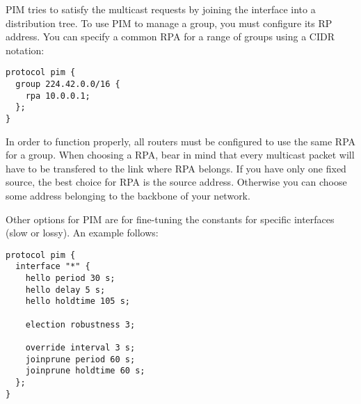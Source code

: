 PIM tries to satisfy the multicast requests by joining the interface into
a distribution tree. To use PIM to manage a group, you must configure its RP
address. You can specify a common RPA for a range of groups using a CIDR
notation:
\begin{lstlisting}
protocol pim {
  group 224.42.0.0/16 {
    rpa 10.0.0.1;
  };
}
\end{lstlisting}

\noindent In order to function properly, all routers must be configured to use the same
RPA for a group. When choosing a RPA, bear in mind that every multicast packet
will have to be transfered to the link where RPA belongs. If you have only one
fixed source, the best choice for RPA is the source address. Otherwise you can
choose some address belonging to the backbone of your network.

Other options for PIM are for fine-tuning the constants for specific
interfaces (slow or lossy). An example follows:

\begin{lstlisting}
protocol pim {
  interface "*" {
    hello period 30 s;
    hello delay 5 s;
    hello holdtime 105 s;

    election robustness 3;

    override interval 3 s;
    joinprune period 60 s;
    joinprune holdtime 60 s;
  };
}
\end{lstlisting}

